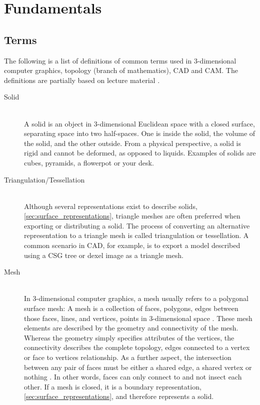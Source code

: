 \chapter{Fundamentals} %
\label{ch:fundamentals}

\section{Terms}
\label{sec:definitions}

The following is a list of definitions of common terms used in 3-dimensional computer graphics, topology (branch of mathematics), CAD and CAM. The definitions are partially based on lecture material \cite{mesh_basics, mesh_lecture10}.

\begin{description}

	\item[Solid] \hfill \\
	A solid is an object in 3-dimensional Euclidean space with a closed surface, separating space into two half-spaces.
	One is inside the solid, the volume of the solid, and the other outside.
	From a physical perspective, a solid is rigid and cannot be deformed, as opposed to \eg liquids.
	Examples of solids are cubes, pyramids, a flowerpot or your desk.


	\item[Triangulation/Tessellation] \hfill \\
	Although several representations exist to describe solids, \cf \cref{sec:surface_representations}, triangle meshes are often preferred when exporting or distributing a solid.
	The process of converting an alternative representation to a triangle mesh is called triangulation or tessellation.
	A common scenario in CAD, for example, is to export a model described using a CSG tree or dexel image as a triangle mesh.




	\item[Mesh] \hfill \\
	In 3-dimensional computer graphics, a mesh usually refers to a polygonal surface mesh:
	A mesh is a collection of faces, \ie polygons, edges between those faces, \ie lines, and vertices, \ie points in 3-dimensional space \cite{mesh_basics}.
	These mesh elements are described by the geometry and connectivity of the mesh.
	Whereas the geometry simply specifies attributes of the vertices, the connectivity describes the complete topology, \eg edges connected to a vertex or face to vertices relationship.
	As a further aspect, the intersection between any pair of faces must be either a shared edge, a shared vertex or nothing \cite{mesh_lecture10}.
	In other words, faces can only connect to and not insect each other.
	If a mesh is closed, it is a boundary representation, \cf \cref{sec:surface_representations}, and therefore represents a solid.


\end{description}
